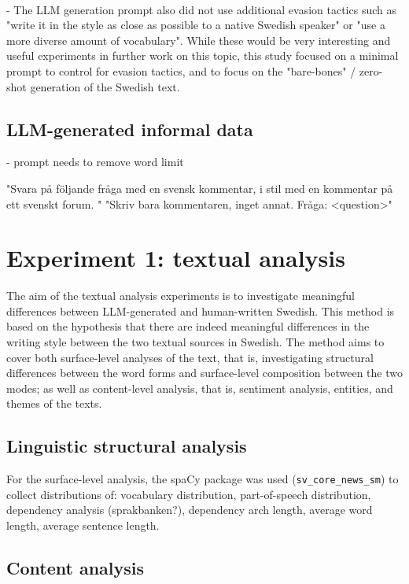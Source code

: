 \documentclass[thesis]{cluu}
\begin{document}
\paragraph{}
-  The LLM generation prompt also did not use additional evasion tactics
such as "write it in the style as close as possible to a native Swedish speaker" or "use a more diverse amount of vocabulary". While these would be very interesting and useful experiments in further
work on this topic, this study focused on a minimal prompt to control for evasion tactics, and to focus on the "bare-bones" / zero-shot generation of the Swedish text.

\subsection{LLM-generated informal data}

- prompt needs to remove word limit

    "Svara på följande fråga med en svensk kommentar, i stil med en kommentar på ett svenskt forum. "
    "Skriv bara kommentaren, inget annat. Fråga: <question>"

\section{Experiment 1: textual analysis}

The aim of the textual analysis experiments is to investigate
meaningful differences between LLM-generated and human-written
Swedish. This method is based on the hypothesis that there are
indeed meaningful differences in the writing style between the
two textual sources in Swedish. The method aims to cover both
surface-level analyses of the text, that is, investigating
structural differences between the word forms and surface-level
composition between the two modes; as well as content-level
analysis, that is, sentiment analysis, entities, and themes of
the texts.
\subsection{Linguistic structural analysis}
For the surface-level analysis, the spaCy package was used
(\texttt{sv\_core\_news\_sm}) to collect distributions of:
vocabulary distribution, part-of-speech distribution, dependency
analysis (sprakbanken?), dependency arch length, average word
length, average sentence length.

\subsection{Content analysis}
\end{document}
